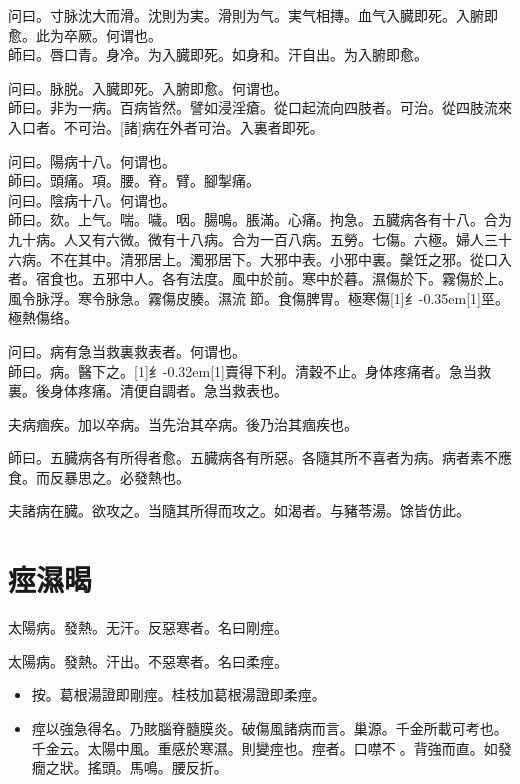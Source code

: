 \documentclass[oneside,b4paper]{ctexbook}
\begin{document}
\begin{flushleft}
问曰。寸脉沈大而滑。沈則为実。滑則为气。実气相摶。血气入臓即死。入腑即愈。此为卒厥。何谓也。\\
師曰。唇口青。身冷。为入臓即死。如身和。汗自出。为入腑即愈。

问曰。脉脱。入臓即死。入腑即愈。何谓也。\\
師曰。非为一病。百病皆然。譬如浸淫瘡。從口起流向四肢者。可治。從四肢流來入口者。不可治。[諸]病在外者可治。入裏者即死。

问曰。陽病十八。何谓也。\\
師曰。頭痛。項。腰。脊。臂。腳掣痛。\\
问曰。陰病十八。何谓也。\\
師曰。欬。上气。喘。噦。咽。腸鳴。脹滿。心痛。拘急。五臓病各有十八。合为九十病。人又有六微。微有十八病。合为一百八病。五勞。七傷。六極。婦人三十六病。不在其中。清邪居上。濁邪居下。大邪中表。小邪中裏。䅽饪之邪。從口入者。宿食也。五邪中人。各有法度。風中於前。寒中於暮。濕傷於下。霧傷於上。風令脉浮。寒令脉急。霧傷皮腠。濕流{𬮦}節。食傷脾胃。極寒傷{\hbox{\scalebox{0.68}[1]{纟}\kern-0.35em\scalebox{0.64}[1]{巠}}}。極熱傷络。

问曰。病有急当救裏救表者。何谓也。\\
師曰。病。醫下之。{\hbox{\scalebox{0.6}[1]{纟}\kern-0.32em\scalebox{0.7}[1]{賣}}}得下利。清穀不止。身体疼痛者。急当救裏。後身体疼痛。清便自調者。急当救表也。

夫病痼疾。加以卒病。当先治其卒病。後乃治其痼疾也。

師曰。五臓病各有所得者愈。五臓病各有所惡。各隨其所不喜者为病。病者素不應食。而反暴思之。必發熱也。

夫諸病在臓。欲攻之。当隨其所得而攻之。如渴者。与豬苓湯。馀皆仿此。

\chapter{痙濕暍}

太陽病。發熱。无汗。反惡寒者。名曰剛痙。

太陽病。發熱。汗出。不惡寒者。名曰柔痙。

\begin{itemize}
\item 按。葛根湯證即剛痙。桂枝加葛根湯證即柔痙。
\item 痙以強急得名。乃賅腦脊髓膜炎。破傷風諸病而言。巢源。千金所載可考也。千金云。太陽中風。重感於寒濕。則變痙也。痙者。口噤不{𫔭}。背強而直。如發癇之狀。搖頭。馬鳴。腰反折。
\end{itemize}


\end{flushleft}
\end{document}
